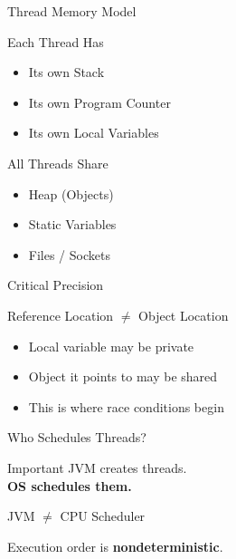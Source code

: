 \documentclass[aspectratio=169,11pt]{beamer}
\begin{document}
	\begin{frame}{Thread Memory Model}
		\begin{block}{Each Thread Has}
			\begin{itemize}
				\item Its own Stack
				\item Its own Program Counter
				\item Its own Local Variables
			\end{itemize}
		\end{block}
		
		\begin{block}{All Threads Share}
			\begin{itemize}
				\item Heap (Objects)
				\item Static Variables
				\item Files / Sockets
			\end{itemize}
		\end{block}
	\end{frame}
	
	\begin{frame}{Critical Precision}
		\begin{center}
			\Large
			Reference Location $\neq$ Object Location
		\end{center}
		
		\vspace{5mm}
		
		\begin{itemize}
			\item Local variable may be private
			\item Object it points to may be shared
			\item This is where race conditions begin
		\end{itemize}
	\end{frame}
	
	\begin{frame}{Who Schedules Threads?}
		\begin{block}{Important}
			JVM creates threads. \\
			\textbf{OS schedules them.}
		\end{block}
		
		\vspace{4mm}
		
		\begin{center}
			JVM $\neq$ CPU Scheduler
		\end{center}
		
		\vspace{4mm}
		
		Execution order is \textbf{nondeterministic}.
	\end{frame}
	
\end{document}
